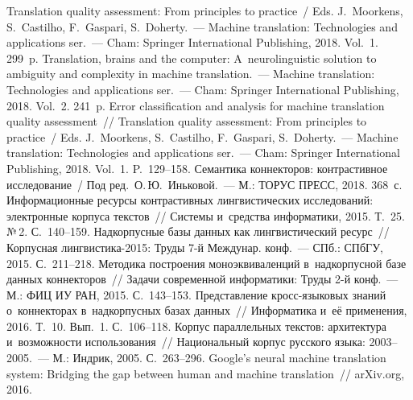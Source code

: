 \begin{multicols}{2}
   {\small\frenchspacing
 {%
 \begin{thebibliography}{99}
Translation quality assessment: From principles to practice~/ 
Eds. J.~Moorkens, S.~Castilho, F.~Gaspari, S.~Doherty.~---
Machine translation: Technologies and applications ser.~--- 
Cham: Springer International Publishing, 
2018. Vol.~1. 299~p.
 Translation, brains and the computer: 
A~neurolinguistic solution to ambiguity and 
complexity in machine translation.~--- Machine translation: Technologies and 
applications ser.~--- 
Cham: Springer International Publishing, 2018. Vol.~2. 241~p.
Error classification and analysis for machine translation quality 
assessment~//
Translation quality 
assessment: From principles to practice~/ 
Eds. J.~Moorkens, S.~Castilho, F.~Gaspari, S.~Doherty.~---
Machine translation: Technologies and applications ser.~--- 
Cham: Springer International Publishing, 2018. Vol.~1. P.~129--158.
Семантика коннекторов: контрастивное исследование~/ Под ред.\ О.\,Ю.~Иньковой.~--- М.: 
ТОРУС ПРЕСС, 2018. 368~с.
 Информационные ресурсы конт\-растивных лингвистических 
исследований: электронные корпуса текстов~// Системы и~средства информатики, 2015. 
Т.~25. №\,2. С.~140--159.
 Надкорпусные базы 
данных как лингвистический ресурс~// Корпусная лингвистика-2015: Труды 7-й Междунар. 
конф.~--- СПб.: СПбГУ, 2015. С.~211--218.
 Методика построения 
моноэквиваленций в~надкорпусной базе данных коннекторов~// Задачи современной 
информатики: Труды 2-й конф.~--- М.: ФИЦ ИУ РАН, 2015. С.~143--153.
 Представление  
кросс-язы\-ко\-вых знаний о~коннекторах в~надкорпусных базах данных~// Информатика 
и~её применения, 2016. Т.~10. Вып.~1. С.~106--118.
 Корпус параллельных текстов: 
архитектура и~возможности использования~// Национальный корпус русского языка:  
2003--2005.~--- М.: Индрик, 2005. С.~263--296.
 Google's neural machine translation system: Bridging the 
gap between human and machine translation~// arXiv.org, 2016. {\sf 
}
\end{thebibliography}}}
\end{multicols}
